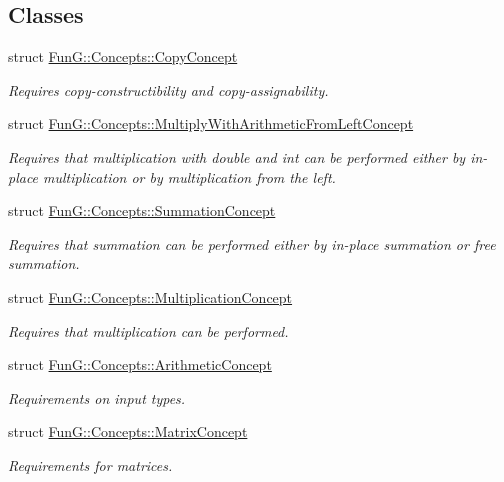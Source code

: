 \subsection*{Classes}
\begin{DoxyCompactItemize}
\item 
struct \hyperlink{structFunG_1_1Concepts_1_1CopyConcept}{Fun\+G\+::\+Concepts\+::\+Copy\+Concept}
\begin{DoxyCompactList}\small\item\em Requires copy-\/constructibility and copy-\/assignability. \end{DoxyCompactList}\item 
struct \hyperlink{structFunG_1_1Concepts_1_1MultiplyWithArithmeticFromLeftConcept}{Fun\+G\+::\+Concepts\+::\+Multiply\+With\+Arithmetic\+From\+Left\+Concept}
\begin{DoxyCompactList}\small\item\em Requires that multiplication with double and int can be performed either by in-\/place multiplication or by multiplication from the left. \end{DoxyCompactList}\item 
struct \hyperlink{structFunG_1_1Concepts_1_1SummationConcept}{Fun\+G\+::\+Concepts\+::\+Summation\+Concept}
\begin{DoxyCompactList}\small\item\em Requires that summation can be performed either by in-\/place summation or free summation. \end{DoxyCompactList}\item 
struct \hyperlink{structFunG_1_1Concepts_1_1MultiplicationConcept}{Fun\+G\+::\+Concepts\+::\+Multiplication\+Concept}
\begin{DoxyCompactList}\small\item\em Requires that multiplication can be performed. \end{DoxyCompactList}\item 
struct \hyperlink{structFunG_1_1Concepts_1_1ArithmeticConcept}{Fun\+G\+::\+Concepts\+::\+Arithmetic\+Concept}
\begin{DoxyCompactList}\small\item\em Requirements on input types. \end{DoxyCompactList}\item 
struct \hyperlink{structFunG_1_1Concepts_1_1MatrixConcept}{Fun\+G\+::\+Concepts\+::\+Matrix\+Concept}
\begin{DoxyCompactList}\small\item\em Requirements for matrices. \end{DoxyCompactList}\item 

\end{DoxyCompactItemize}
